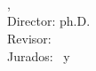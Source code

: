 \begin{titlepage}
	\thesisDate \\

\end{titlepage}


\hfill
\vfill
{
	\small
	\textbf{\thesisName} \\
	\textit{\thesisTitle} \\
	\thesisSubject, \thesisDate \\
	Director: \thesisFirstReviewer ph.D. \\
	Revisor: \thesisSecondReviewer \\
	Jurados: \thesisFirstSupervisor\ y \thesisSecondSupervisor \\[1.5em]
	\textbf{\thesisUniversity} \\
	\textit{\thesisUniversityGroup} \\
	\thesisUniversityInstitute \\
	\thesisUniversityDepartment \\
	\thesisUniversityStreetAddress \\
	\thesisUniversityCity \\
	\thesisUniversityPostalCode
}
